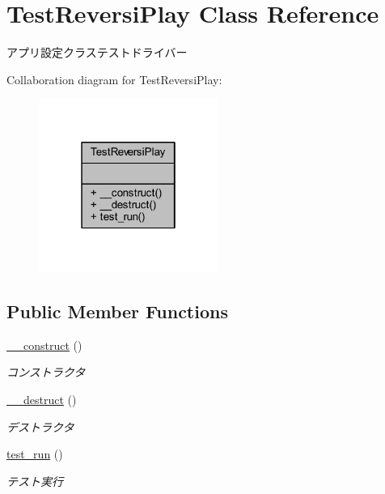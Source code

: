 \hypertarget{class_test_reversi_play}{}\section{Test\+Reversi\+Play Class Reference}
\label{class_test_reversi_play}


アプリ設定クラステストドライバー  




Collaboration diagram for Test\+Reversi\+Play\+:
\nopagebreak
\begin{figure}[H]
\begin{center}
\leavevmode
\includegraphics[width=166pt]{class_test_reversi_play__coll__graph}
\end{center}
\end{figure}
\subsection*{Public Member Functions}
\begin{DoxyCompactItemize}
\item 
\hyperlink{class_test_reversi_play_a095c5d389db211932136b53f25f39685}{\+\_\+\+\_\+construct} ()
\begin{DoxyCompactList}\small\item\em コンストラクタ \end{DoxyCompactList}\item 
\hyperlink{class_test_reversi_play_a421831a265621325e1fdd19aace0c758}{\+\_\+\+\_\+destruct} ()
\begin{DoxyCompactList}\small\item\em デストラクタ \end{DoxyCompactList}\item 
\hyperlink{class_test_reversi_play_a9b029832cfdf19c0ef36b1f5ef7b7735}{test\+\_\+run} ()
\begin{DoxyCompactList}\small\item\em テスト実行 \end{DoxyCompactList}\end{DoxyCompactItemize}


